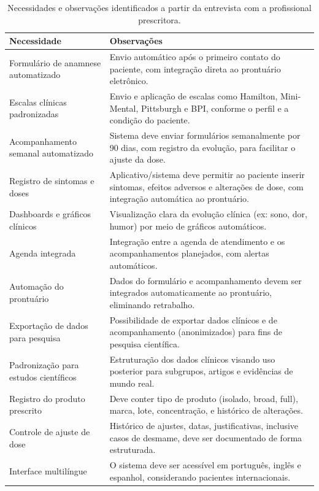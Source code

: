 \href{}{}\documentclass[12pt,portuguese,oneside]{article}
\begin{document}
\begin{table}[H]
\centering
\caption{Necessidades e observações identificados a partir da entrevista com a profissional prescritora.}
\begin{tabularx}{\textwidth}{|>{\raggedright\arraybackslash}p{4.2cm}|>{\raggedright\arraybackslash}X|}
\hline
\rowcolor{gray!20}
\textbf{Necessidade} & \textbf{Observações} \\
\hline
Formulário de anamnese automatizado & Envio automático após o primeiro contato do paciente, com integração direta ao prontuário eletrônico. \\
\hline
Escalas clínicas padronizadas & Envio e aplicação de escalas como Hamilton, Mini-Mental, Pittsburgh e BPI, conforme o perfil e a condição do paciente. \\
\hline
Acompanhamento semanal automatizado & Sistema deve enviar formulários semanalmente por 90 dias, com registro da evolução, para facilitar o ajuste da dose. \\
\hline
Registro de sintomas e doses & Aplicativo/sistema deve permitir ao paciente inserir sintomas, efeitos adversos e alterações de dose, com integração automática ao prontuário. \\
\hline
Dashboards e gráficos clínicos & Visualização clara da evolução clínica (ex: sono, dor, humor) por meio de gráficos automáticos. \\
\hline
Agenda integrada & Integração entre a agenda de atendimento e os acompanhamentos planejados, com alertas automáticos. \\
\hline
Automação do prontuário & Dados do formulário e acompanhamento devem ser integrados automaticamente ao prontuário, eliminando retrabalho. \\
\hline
Exportação de dados para pesquisa & Possibilidade de exportar dados clínicos e de acompanhamento (anonimizados) para fins de pesquisa científica. \\
\hline
Padronização para estudos científicos & Estruturação dos dados clínicos visando uso posterior para subgrupos, artigos e evidências de mundo real. \\
\hline
Registro do produto prescrito & Deve conter tipo de produto (isolado, broad, full), marca, lote, concentração, e histórico de alterações. \\
\hline
Controle de ajuste de dose & Histórico de ajustes, datas, justificativas, inclusive casos de desmame, deve ser documentado de forma estruturada. \\
\hline
Interface multilíngue & O sistema deve ser acessível em português, inglês e espanhol, considerando pacientes internacionais. \\

\end{tabularx}
\end{table}
\end{document}
